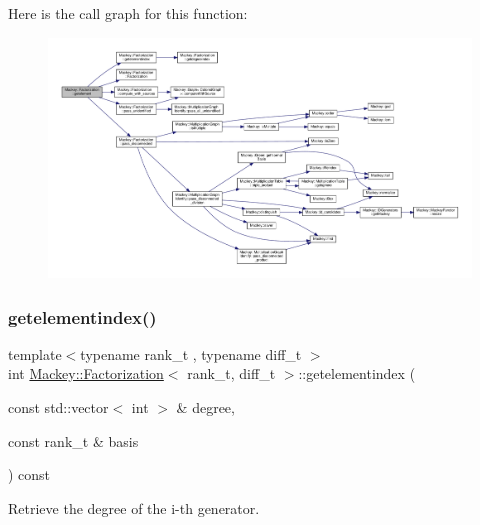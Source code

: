 Here is the call graph for this function\+:\nopagebreak
\begin{figure}[H]
\begin{center}
\leavevmode
\includegraphics[width=350pt]{classMackey_1_1Factorization_a6e15f1fb3623685326255f7badf7eee9_cgraph}
\end{center}
\end{figure}
\mbox{\label{classMackey_1_1Factorization_a5217ad8ca4aaa13b900adda77893249b}} 
\subsubsection{\texorpdfstring{getelementindex()}{getelementindex()}}
{\footnotesize\ttfamily template$<$typename rank\+\_\+t , typename diff\+\_\+t $>$ \\
int \hyperlink{classMackey_1_1Factorization}{Mackey\+::\+Factorization}$<$ rank\+\_\+t, diff\+\_\+t $>$\+::getelementindex (\begin{DoxyParamCaption}\item[{const std\+::vector$<$ int $>$ \&}]{degree,  }\item[{const rank\+\_\+t \&}]{basis }\end{DoxyParamCaption}) const\hspace{0.3cm}{\ttfamily [inline]}}



Retrieve the degree of the i-\/th generator. 

